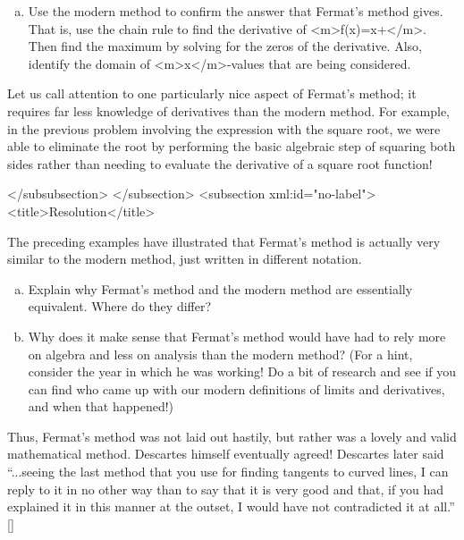\begin{refsection}
\begin{task}
\begin{enumerate}[(a)]
\item Use the modern method to confirm the answer that Fermat's method
  gives.  That is, use the chain rule to find the derivative of
  <m>f(x)=x+</m>. Then find the maximum by solving for the
  zeros of the derivative.  Also, identify the domain of <m>x</m>-values
  that are being considered.

\end{enumerate}
\end{task}

Let us call attention to one particularly nice aspect of Fermat's
method; it requires far less knowledge of derivatives than the modern
method.  For example, in the previous problem involving the expression
with the square root, we were able to eliminate the root by performing
the basic algebraic step of squaring both sides rather than needing to
evaluate the derivative of a square root function!



</subsubsection>
</subsection>
<subsection xml:id="no-label">
<title>Resolution</title>


The preceding examples have illustrated that Fermat's method is
actually very similar to the modern method, just written in different
notation.

\begin{task}\begin{enumerate}[(a)]
  \item Explain why Fermat's method and the modern method are
    essentially equivalent.  Where do they differ?
    \item Why does it make sense that Fermat's method would have had
      to rely more on algebra and less on analysis than the modern
      method? (For a hint, consider the year in which he was working!
      Do a bit of research and see if you can find who came up with
      our modern definitions of limits and derivatives, and when that
      happened!)
\end{enumerate}
 \end{task}

 Thus, Fermat's method was not laid out hastily, but rather was a
 lovely and valid mathematical method.  Descartes himself eventually
 agreed!  Descartes later said ``{\sf ...seeing the last method that
   you use for finding tangents to curved lines, I can reply to it in
   no other way than to say that it is very good and that, if you had
   explained it in this manner at the outset, I would have not
   contradicted it at all.}'' [\cite[page 192]{FermatBio}]


\end{refsection}
